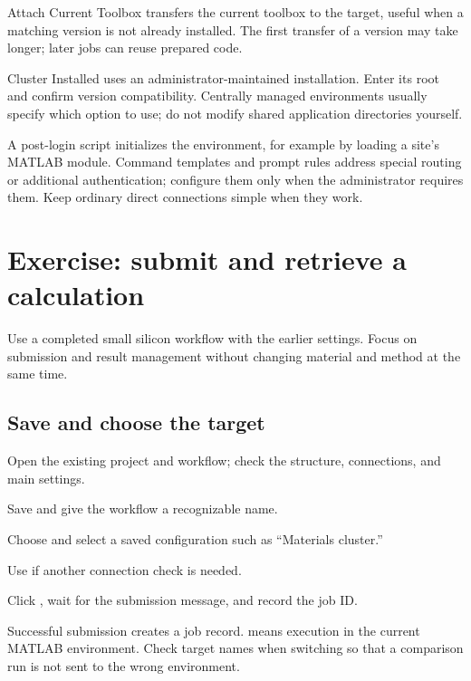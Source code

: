 Attach Current Toolbox transfers the current toolbox to the target, useful when a matching version is not already installed. The first transfer of a version may take longer; later jobs can reuse prepared code.

Cluster Installed uses an administrator-maintained installation. Enter its root and confirm version compatibility. Centrally managed environments usually specify which option to use; do not modify shared application directories yourself.

A post-login script initializes the environment, for example by loading a site's MATLAB\regmark{} module. Command templates and prompt rules address special routing or additional authentication; configure them only when the administrator requires them. Keep ordinary direct connections simple when they work.

\section{Exercise: submit and retrieve a calculation}

Use a completed small silicon workflow with the earlier settings. Focus on submission and result management without changing material and method at the same time.

\subsection{Save and choose the target}

\begin{steps}
\item Open the existing project and workflow; check the structure, connections, and main settings.
\item Save and give the workflow a recognizable name.
\item Choose  and select a saved configuration such as ``Materials cluster.''
\item Use  if another connection check is needed.
\item Click , wait for the submission message, and record the job ID.
\end{steps}

Successful submission creates a job record.  means execution in the current MATLAB\regmark{} environment. Check target names when switching so that a comparison run is not sent to the wrong environment.

